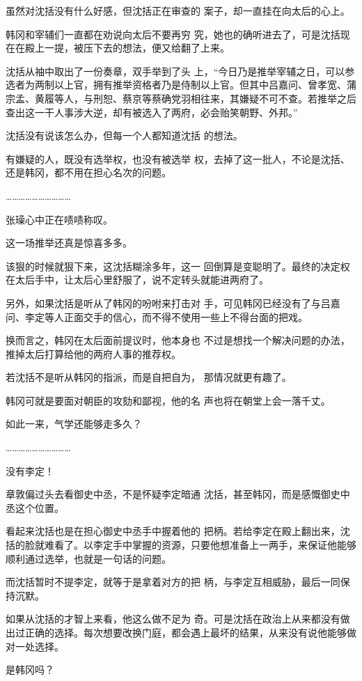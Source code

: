 虽然对沈括没有什么好感，但沈括正在审查的 案子，却一直挂在向太后的心上。

韩冈和宰辅们一直都在劝说向太后不要再穷 究，她也的确听进去了，可是沈括现在在殿上一提，被压下去的想法，便又给翻了上来。

沈括从袖中取出了一份奏章，双手举到了头 上，“今日乃是推举宰辅之日，可以参选者为两制以上官，拥有推举资格者乃是侍制以上官。但其中吕嘉问、曾孝宽、蒲宗孟、黄履等人，与刑恕、蔡京等蔡确党羽相往来，其嫌疑不可不查。若推举之后查出这一干人事涉大逆，却有被选入了两府，必会贻笑朝野、外邦。”

沈括没有说该怎么办，但每一个人都知道沈括 的想法。

有嫌疑的人，既没有选举权，也没有被选举 权，去掉了这一批人，不论是沈括、还是韩冈，都不用在担心名次的问题。

…………………………

张璪心中正在啧啧称叹。

这一场推举还真是惊喜多多。

该狠的时候就狠下来，这沈括糊涂多年，这一 回倒算是变聪明了。最终的决定权在太后手中，让太后心里舒服了，说不定转头就能进两府了。

另外，如果沈括是听从了韩冈的吩咐来打击对 手，可见韩冈已经没有了与吕嘉问、李定等人正面交手的信心，而不得不使用一些上不得台面的把戏。

换而言之，韩冈在太后面前提议时，他本身也 不过是想找一个解决问题的办法，推掉太后打算给他的两府人事的推荐权。

若沈括不是听从韩冈的指派，而是自把自为， 那情况就更有趣了。

韩冈可就是要面对朝臣的攻劾和鄙视，他的名 声也将在朝堂上会一落千丈。

如此一来，气学还能够走多久？

…………………………

没有李定！

章敦偏过头去看御史中丞，不是怀疑李定暗通 沈括，甚至韩冈，而是感慨御史中丞这个位置。

看起来沈括也是在担心御史中丞手中握着他的 把柄。若给李定在殿上翻出来，沈括的脸就难看了。以李定手中掌握的资源，只要他想准备上一两手，来保证他能够顺利通过选举，也就是一句话的问题。

而沈括暂时不提李定，就等于是拿着对方的把 柄，与李定互相威胁，最后一同保持沉默。

如果从沈括的才智上来看，他这么做不足为 奇。可是沈括在政治上从来都没有做出过正确的选择。每次想要改换门庭，都会遇上最坏的结果，从来没有说他能够做对一处选择。

是韩冈吗？

